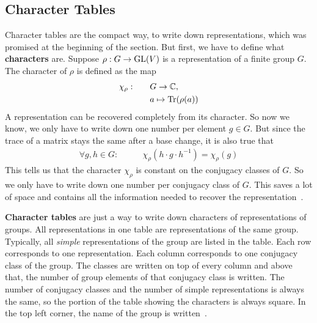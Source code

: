 \subsection{Character Tables}

Character tables are the compact way, to write down representations, which was promised at the beginning of the section.
But first, we have to define what \textbf{characters} are.
Suppose $\rho: G \to \operatorname{GL}(V)$ is a representation of a finite group $G$.
The character of $\rho$ is defined as the map
\begin{subequations}
    \begin{align}
        \chi_\rho: \qquad & G \to \mathbb{C}, \\
        & a \mapsto \operatorname{Tr}(\rho(a))
    \end{align}
\end{subequations}
A representation can be recovered completely from its character.
So now we know, we only have to write down one number per element $g \in G$.
But since the trace of a matrix stays the same after a base change, it is also true that
\begin{align}
    \forall g, h \in G: \qquad & \chi_\rho(h \cdot g \cdot h^{-1}) = \chi_\rho(g)
\end{align}
This tells us that the character $\chi_\rho$ is constant on the conjugacy classes of $G$.
So we only have to write down one number per conjugacy class of $G$.
This saves a lot of space and contains all the information needed to recover the representation~\cite{fulton2013}.


\textbf{Character tables} are just a way to write down characters of representations of groups.
All representations in one table are representations of the same group.
Typically, all \textit{simple} representations of the group are listed in the table.
Each row corresponds to one representation.
Each column corresponds to one conjugacy class of the group.
The classes are written on top of every column and above that, the number of group elements of that conjugacy class is written.
The number of conjugacy classes and the number of simple representations is always the same, so the portion of the table showing the characters is always square.
In the top left corner, the name of the group is written~\cite{fulton2013}.
